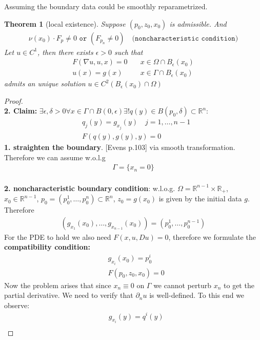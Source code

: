 \documentclass[a4paper,11pt,oneside,fleqn]{book}
\newtheorem{theorem}{Theorem}[section]
\theoremstyle{definition}
\theoremstyle{remark}
\begin{document}
Assuming the boundary data could be smoothly reparametrized. 
\begin{theorem}[local existence]
	Suppose $(p_0, z_0, x_0)$ is admissible. And
	\begin{align*}
		\nu(x_0) \cdot F_p \neq 0 \texttt{ or }(F_{p_n} \neq 0) \quad (\texttt{noncharacteristic condition)}
	\end{align*}
	Let $u \in C^1$, then there exists $\epsilon > 0$ such that 
	\begin{align*}
		F(\nabla u, u, x) = 0 \quad &x \in \Omega \cap B_\epsilon(x_0)\\
		u(x) = g(x) \quad &x \in \Gamma \cap B_\epsilon (x_0)
	\end{align*} 
	admits an unique solution $u \in C^2(B_\epsilon(x_0) \cap \Omega)$
\end{theorem}
\begin{proof}\quad\\
\textbf{2. Claim:} $\exists \epsilon, \delta > 0 \forall x \in \Gamma \cap B(0, \epsilon) \exists ! q(y) \in B(p_0, \delta) \subset \mathbb{R}^n$:
\begin{align*}
	&q_j(y) = g_{x_j}(y)  \quad j = 1, \dots, n-1\\
	&F(q(y), g(y), y) = 0
\end{align*}
\textbf{1. straighten the boundary}.	[Evens p.103] via smooth transformation. Therefore we can assume w.o.l.g 
\begin{align*}
	\Gamma= \{x_n = 0\}
\end{align*} \\
\textbf{2. noncharacteristic boundary condition}: 
w.l.o.g. $\Omega = \mathbb{R}^{n - 1} \times \mathbb{R}_+$, $x_0 \in \mathbb{R}^{n-1}$,  $p_0 = (p_0^1, \dots, p_0^n) \subset \mathbb{R}^n$, $z_0 = g(x_0)$ is given by the initial data $g$. Therefore 
\begin{align*}
	(g_{x_1}(x_0), \dots, g_{x_{n-1}}(x_0)) = (p_0^1, \dots, p_0^{n-1})
\end{align*}
For the PDE to hold we also need $F(x, u, Du) = 0$, therefore we formulate the \textbf{compatibility condition:}
\begin{align*}
	&g_{x_i}(x_0) = p_0^i \\
	&F(p_0, z_0, x_0) = 0
\end{align*}
Now the problem arises that since $x_n \equiv 0$ on $\Gamma$ we cannot perturb $x_n$ to get the partial derivative. We need to verify that $\partial_n u$ is well-defined. To this end we observe:
\begin{align*}
	&g_{x_i}(y) = q^i(y)\\

\end{align*}
\end{proof}
\end{document}
